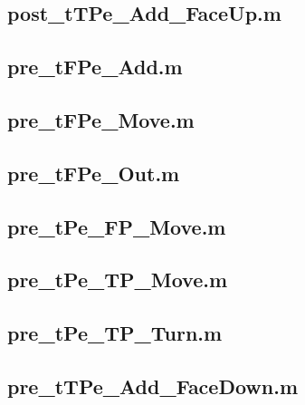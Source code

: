 \documentclass[runningheads,a4paper]{llncs}
\newcommand{\GPenSIM}{../GPenSIM}
\begin{document}
\subsection{post\_tTPe\_Add\_FaceUp.m}
\label{app:post_tTPe_Add_FaceUp}


\subsection{pre\_tFPe\_Add.m}
\label{app:pre_tFPe_Add}


\subsection{pre\_tFPe\_Move.m}
\label{app:pre_tFPe_Move}


\subsection{pre\_tFPe\_Out.m}
\label{app:pre_tFPe_Out}


\subsection{pre\_tPe\_FP\_Move.m}
\label{app:pre_tPe_FP_Move}


\subsection{pre\_tPe\_TP\_Move.m}
\label{app:pre_tPe_TP_Move}


\subsection{pre\_tPe\_TP\_Turn.m}
\label{app:pre_tPe_TP_Turn}


\subsection{pre\_tTPe\_Add\_FaceDown.m}
\label{app:pre_tTPe_Add_FaceDown}

\end{document}
